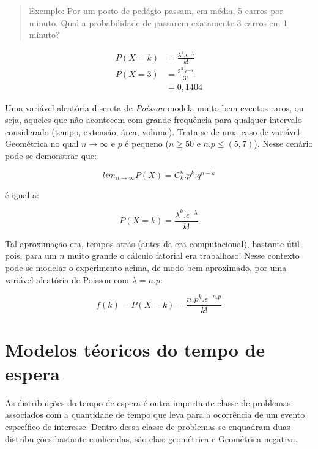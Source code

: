\documentclass[
]{book}
\begin{document}
\hfill\break

\begin{quote}
Exemplo: Por um posto de pedágio passam, em média, 5 carros por minuto. Qual a probabilidade de passarem exatamente 3 carros em 1 minuto?
\end{quote}

\hfill\break

\begin{align*}
P(X=k) & = \frac{\lambda ^{k}. \epsilon^{-\lambda}} {k!} \\
P(X=3) & = \frac{5^{3}. \epsilon^{-5}} {3!} \\
       & = 0,1404
\end{align*}

Uma variável aleatória discreta de \emph{Poisson} modela muito bem eventos raros; ou seja, aqueles que não acontecem com grande frequência para qualquer intervalo considerado (tempo, extensão, área, volume). Trata-se de uma caso de variável Geométrica no qual \(n \to \infty\) e \(p\) é pequeno (\(n \ge 50\) e \(n . p \le (5,7)\)). Nesse cenário pode-se demonstrar que:

\hfill\break

\[
lim_{n \to \infty} P(X) = {C}_{k}^{n}. {p}^{k}. {q}^{n-k}
\]

\hfill\break

é igual a:

\hfill\break

\[
P(X=k) = \frac{\lambda ^{k}. \epsilon^{-\lambda}} {k!}
\]

\hfill\break

Tal aproximação era, tempos atrás (antes da era computacional), bastante útil pois, para um \(n\) muito grande o cálculo fatorial era trabalhoso! Nesse contexto pode-se modelar o experimento acima, de modo bem aproximado, por uma variável aleatória de Poisson com \(\lambda=n . p\):

\[
f(k) = P(X=k) = \frac{n . p^{k}. \epsilon^{- n . p}} {k!}
\]

\hypertarget{modelos-tuxe9oricos-do-tempo-de-espera}{%
\section{Modelos téoricos do tempo de espera}\label{modelos-tuxe9oricos-do-tempo-de-espera}}

As distribuições do tempo de espera é outra importante classe de problemas associados com a quantidade de tempo que leva para a ocorrência de um evento específico de interesse. Dentro dessa classe de problemas se enquadram duas distribuições bastante conhecidas, são elas: geométrica e Geométrica negativa.
\end{document}
